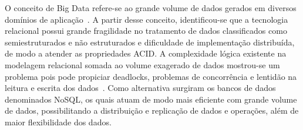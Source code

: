 \documentclass[12pt]{article}
\begin{document}
O conceito de Big Data refere-se ao grande volume de dados gerados em diversos domínios de aplicação~\cite{index2013zettabyte,han2011survey}.
A partir desse conceito, identificou-se que a tecnologia relacional possui grande fragilidade no tratamento de dados classificados como semiestruturados e não estruturados e dificuldade de implementação distribuída, de modo a atender as propriedades ACID. 
A complexidade lógica existente na modelagem relacional somada ao volume exagerado de dados mostrou-se um problema pois pode propiciar deadlocks, problemas de concorrência e lentidão na leitura e escrita dos dados~\cite{han2011survey,brito2010bancos}.
Como alternativa surgiram os bancos de dados denominados NoSQL, os quais atuam de modo mais eficiente com grande volume de dados, possibilitando a distribuição e replicação de dados e operações, além de maior flexibilidade dos dados. 
\end{document}
